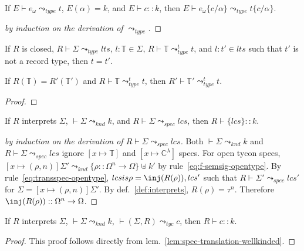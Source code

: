 \begin{lemma}\label{lem:tyc-subst}
If $E\vdash e_\omega \leadsto_{type} t$, $E(\alpha) = k$, and $E\vdash
c :: k$, 
then $E\vdash e_\omega\{c/\alpha\} \leadsto_{type} t\{c/\alpha\}$. 
\end{lemma}
\begin{proof}[by induction on the derivation of $\leadsto_{type}$]
\end{proof}

\begin{lemma}\label{lem:typesyn-correct}
If $R$ is closed, $R\vdash \Sigma \leadsto_{type} lts$, 
$l:\mathbb{T}\in \Sigma$, $R\vdash \mathbb{T}
\leadsto^t_{type} t$, and $l:t'\in lts$ such that $t'$ is not a record
type, then $t=t'$.
\end{lemma}

\begin{lemma}\label{lem:relty-trans}
If $R(\mathbb{T})=R'(\mathbb{T}')$ and $R\vdash\mathbb{T}
\leadsto^t_{type} t$, then $R'\vdash\mathbb{T}' \leadsto^t_{type} t$. 
\end{lemma}
\begin{proof}
\end{proof}

\begin{lemma}\label{lem:spec-translation-wellkinded}
If $R$ interprets $\Sigma$, $\vdash \Sigma \leadsto_{knd} k$, and $R \vdash \Sigma
\leadsto_{spec} lcs$, then $R \vdash \{ lcs \} :: k$. 
\end{lemma}
\begin{proof}[by induction on the derivation of $R\vdash \Sigma
  \leadsto_{spec} lcs$]
Both $\vdash \Sigma \leadsto_{knd} k$ and $R\vdash \Sigma
\leadsto_{spec} lcs$ ignore $[x\mapsto\mathbb{T}]$ and
$[x\mapsto\mathbb{C}^\lambda]$ specs. For open tycon specs,
$[x\mapsto(\rho,n)]\Sigma'\leadsto_{knd} \{\rho::\Omega^n\to \Omega\}
\uplus k'$ by rule~\ref{eq:f-semsig-opentype}. By
rule~\ref{eq:transspec-opentype}, $lcs is \rho=\inj(R(\rho)), lcs'$
such that $R\vdash \Sigma' \leadsto_{spec} lcs'$ for
$\Sigma=[x\mapsto(\rho,n)]\Sigma'$. By def.~\ref{def:interprets},
$R(\rho) = \tau^n$. Therefore $\inj(R(\rho)) :: \Omega^n \to \Omega$. 
\end{proof}

\begin{lemma}\label{lem:tyc-translation-wellkinded}
If $R$ interprets $\Sigma$, $\vdash \Sigma \leadsto_{knd} k$, $\vdash (\Sigma, R)
\leadsto_{tyc} c$, then $R\vdash c :: k$. 
\end{lemma}
\begin{proof}
This proof follows directly from lem.~\ref{lem:spec-translation-wellkinded}.
\end{proof}

